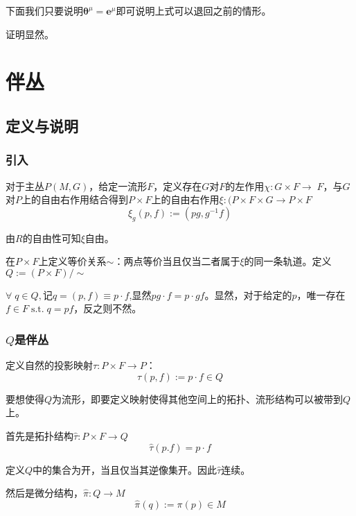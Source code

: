\documentclass{ctexbook}
\begin{document}
下面我们只要说明$\bm{\theta}^\mu=\bm{e}^\mu$即可说明上式可以退回之前的情形。

证明显然。


\chapter{伴丛}

\section{定义与说明}

\subsection{引入}

对于主丛$P(M,G)$，给定一流形$F$，定义存在$G$对$F$的左作用$\chi\colon G\times F\to\;F$，与$G$对$P$上的自由右作用结合得到$P\times F$上的自由右作用$\xi\colon(P\times F\times G\to P\times F$
\begin{equation}
    \xi_{g}(p,f):=(pg,g^{-1}f)
\end{equation}

由$R$的自由性可知$\xi$自由。

在$P\times F$上定义等价关系$\sim$：两点等价当且仅当二者属于$\xi$的同一条轨道。定义$Q:=(P\times F)/\sim$

$\forall\;q\in Q,\text{记}q=(p,f)\equiv p\cdot f$,显然$pg\cdot f=p\cdot g f$。显然，对于给定的$p$，唯一存在$f\in F\;\text{s.t.}\;q=pf$，反之则不然。

\subsection{$Q$是伴丛}

定义自然的投影映射$\tau\colon P\times F\to P$：
\begin{equation}
    \tau(p,f):=p\cdot f\in Q 
\end{equation}

要想使得$Q$为流形，即要定义映射使得其他空间上的拓扑、流形结构可以被带到$Q$上。

首先是拓扑结构$\hat{\tau}\colon P\times F\to Q$
\begin{equation}
    \hat{\tau}(p.f)=p\cdot f
\end{equation}

定义$Q$中的集合为开，当且仅当其逆像集开。因此$\hat{\tau}$连续。

然后是微分结构，$\hat{\pi}\colon Q\to M$
\begin{equation}
    \hat{\pi}(q):=\pi(p)\in M
\end{equation}
\end{document}
